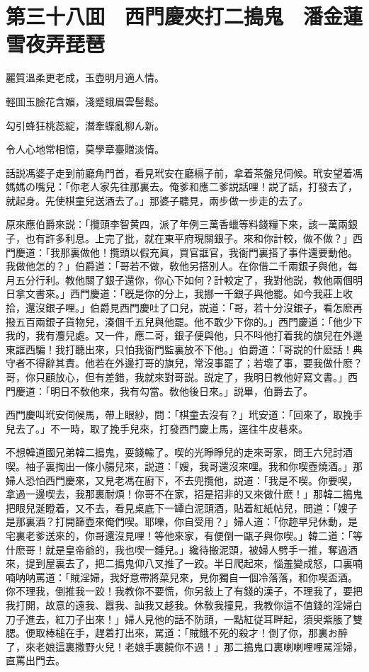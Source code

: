 
\chapter*{第三十八囬　西門慶夾打二搗鬼　潘金蓮雪夜弄琵琶}

麗質溫柔更老成，玉壺明月適人情。

輕囬玉臉花含媚，淺蹙蛾眉雲髻鬆。

勾引蜂狂桃蕊綻，潛牽蝶亂柳ん新。

令人心地常相憶，莫學章臺贈淡情。

話説馮婆子走到前廳角門首，看見玳安在廳槅子前，拿着茶盤兒伺候。玳安望着馮媽媽の嘴兒：「你老人家先往那裏去。俺爹和應二爹説話哩！説了話，打發去了，就起身。先使棋童兒送酒去了。」那婆子聽見，兩步做一步走的去了。

原來應伯爵來説：「攬頭李智黄四，派了年例三萬香蠟等料錢糧下來，該一萬兩銀子，也有許多利息。上完了批，就在東平府現關銀子。來和你計較，做不做？」西門慶道：「我那裏做他！攬頭以假充眞，買官誆官，我衙門裏搭了事件還要動他。我做他怎的？」伯爵道：「哥若不做，敎他另搭別人。在你借二千兩銀子與他，每月五分行利。教他關了銀子還你，你心下如何？計較定了，我對他説，教他兩個明日拿文書來。」西門慶道：「旣是你的分上，我挪一千銀子與他罷。如今我莊上收拾，還沒銀子哩。」伯爵見西門慶吐了口兒，説道：「哥，若十分沒銀子，看怎麽再撥五百兩銀子貨物兒，湊個千五兒與他罷。他不敢少下你的。」西門慶道：「他少下我的，我有灋兒處。又一件，應二哥，銀子便與他，只不呌他打着我的旗兒在外邊東誆西騙！我打聽出來，只怕我衙門監裏放不下他。」伯爵道：「哥説的什麽話！典守者不得辭其責。他若在外邊打哥的旗兒，常沒事罷了；若壞了事，要我做什麽？哥，你只顧放心，但有差錯，我就來對哥説。説定了，我明日教他好寫文書。」西門慶道：「明日不敎他來，我有勾當。敎他後日來。」説畢，伯爵去了。

西門慶叫玳安伺候馬，帶上眼紗，問：「棋童去沒有？」玳安道：「回來了，取挽手兒去了。」不一時，取了挽手兒來，打發西門慶上馬，逕往牛皮巷來。

不想韓道國兄弟韓二搗鬼，耍錢輸了。喫的光睜睜兒的走來哥家，問王六兒討酒喫。袖子裏掏出一條小腸兒來，説道：「嫂，我哥還沒來哩。我和你喫壺燒酒。」那婦人恐怕西門慶來，又見老馮在廚下，不去兜攬他，説道：「我是不喫。你要喫，拿過一邊喫去，我那裏耐煩！你哥不在家，招是招非的又來做什麽！」那韓二搗鬼把眼兒涎瞪着，又不去，看見桌底下一罈白泥頭酒，貼着紅紙帖兒，問道：「嫂子是那裏酒？打開篩壺來俺們喫。耶嚛，你自受用？」婦人道：「你趂早兒休動，是宅裏老爹送來的，你哥還沒見哩！等他來家，有便倒一甌子與你喫。」韓二道：「等什麽哥！就是皇帝爺的，我也喫一鍾兒。」纔待搬泥頭，被婦人劈手一推，奪過酒來，提到屋裏去了，把二搗鬼仰八叉推了一跤。半日爬起來，惱羞變成怒，口裏喃喃呐呐罵道：「賊淫婦，我好意帶將菜兒來，見你獨自一個冷落落，和你喫盃酒。你不理我，倒推我一跤！我教你不要慌，你另敍上了有錢的漢子，不理我了，要把我打開，故意的遠我、囂我、訕我又趍我。休敎我撞見，我教你這不值錢的淫婦白刀子進去，紅刀子出來！」婦人見他的話不防頭，一點紅従耳畔起，須臾紫脹了雙腮。便取棒槌在手，趕着打出來，駡道：「賊餓不死的殺才！倒了你，那裏お醉了，來老娘這裏撒野火兒！老娘手裏饒你不過！」那二搗鬼口裏喇喇哩哩駡淫婦，直罵出門去。


